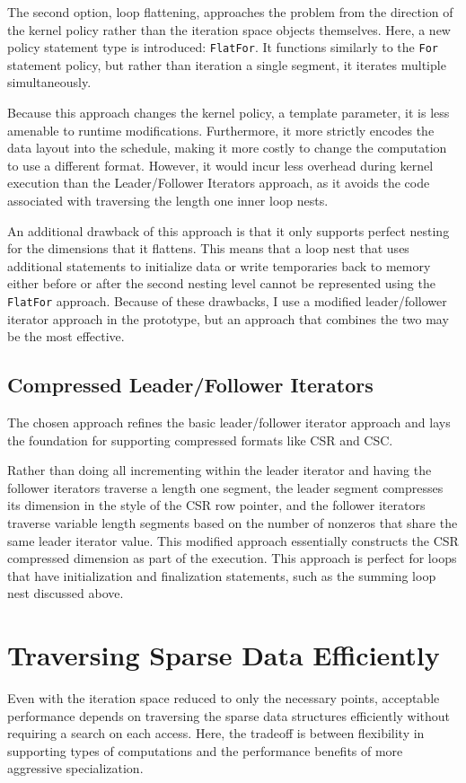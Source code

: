 The second option, loop flattening, approaches the problem from the direction of the kernel policy rather than the iteration space objects themselves.
Here, a new policy statement type is introduced: \verb.FlatFor.. 
It functions similarly to the \verb.For. statement policy, but rather than iteration a single segment, it iterates multiple simultaneously. 

Because this approach changes the kernel policy, a template parameter, it is less amenable to runtime modifications. 
Furthermore, it more strictly encodes the data layout into the schedule, making it more costly to change the computation to use a different format.
However, it would incur less overhead during kernel execution than the Leader/Follower Iterators approach, as it avoids the code associated with traversing the length one inner loop nests.

An additional drawback of this approach is that it only supports perfect nesting for the dimensions that it flattens. 
This means that a loop nest that uses additional statements to initialize data or write temporaries back to memory either before or after the second nesting level cannot be represented using the \verb.FlatFor. approach.
Because of these drawbacks, I use a modified leader/follower iterator approach in the prototype, but an approach that combines the two may be the most effective.

\subsection{Compressed Leader/Follower Iterators}

The chosen approach refines the basic leader/follower iterator approach and lays the foundation for supporting compressed formats like CSR and CSC.

Rather than doing all incrementing within the leader iterator and having the follower iterators traverse a length one segment, the leader segment compresses its dimension in the style of the CSR row pointer, and the follower iterators traverse variable length segments based on the number of nonzeros that share the same leader iterator value.
This modified approach essentially constructs the CSR compressed dimension as part of the execution.
This approach is perfect for loops that have initialization and finalization statements, such as the summing loop nest discussed above. 


\section{Traversing Sparse Data Efficiently}
\label{sec:SparseAccess}
Even with the iteration space reduced to only the necessary points, acceptable performance depends on traversing the sparse data structures efficiently without requiring a search on each access.
Here, the tradeoff is between flexibility in supporting types of computations and the performance benefits of more aggressive specialization.

